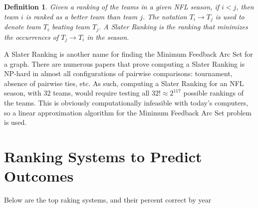 \documentclass[11pt]{article}
\newtheorem{definition}{Definition}
\begin{document}
\begin{definition}\label{def:slater_ranking}
Given a ranking of the teams in a given NFL season, if $i < j$, then team $i$ is ranked as a better team than team $j$. The notation $T_i \rightarrow T_j$ is used to denote team $T_i$ beating team $T_j$. A Slater Ranking is the ranking that minimizes the occurrences of $T_j \rightarrow T_i$ in the season.
\end{definition}

A Slater Ranking is another name for finding the Minimum Feedback Arc Set for a graph.
There are numerous papers that prove computing a Slater Ranking is NP-hard in almost all configurations of pairwise comparisons: tournament, absence of pairwise ties, etc. As such, computing a Slater Ranking for an NFL season, with 32 teams, would require testing all $32! \approx 2^{117}$ possible rankings of the teams. This is obviously computationally infeasible with today's computers, so a linear approximation algorithm for the Minimum Feedback Arc Set problem is used.

\section{Ranking Systems to Predict Outcomes}

Below are the top raking systems, and their percent correct by year

%
% 
\end{document}

